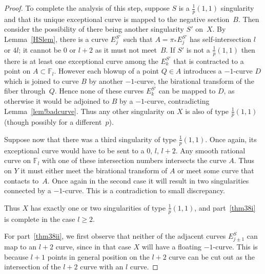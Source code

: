 \documentclass[12pt]{amsbook}
\theoremstyle{plain}
\newcommand{\ldp}{log del Pezzo}
\newcommand{\mb}[1]{\mathbb{#1}}
\newcommand{\F}{\mathbb{F}}
\begin{document}
\begin{proof}
To complete the analysis of this step, suppose $S$ is a $\frac{1}{p}(1,1)$ singularity and that its unique exceptional curve is mapped to the negative section~$B$. Then consider the possibility of there being another singularity $S'$ on~$X$. By Lemma~\ref{HSlem}, there is a curve $E_j^{S'}$ such that $A=\pi_* E_j^{S'}$ has self-intersection $l$ or $4l$; it cannot be $0$ or $l+2$ as it must not meet~$B$. If $S'$ is not a $\frac{1}{p}(1,1)$ then there is at least one exceptional curve among the $E_k^{S'}$ that is contracted to a point on $A\subset\F_l$. However each blowup of a point $Q\in A$ introduces a $-1$-curve $D$ which is joined to curve $B$ by another $-1$-curve, the birational transform of the fiber through~$Q$. Hence none of these curves $E_k^{S'}$ can be mapped to $D$, as otherwise it would be adjoined to $B$ by a $-1$-curve, contradicting Lemma~\ref{lem!badcurve}.
Thus any other singularity on $X$ is also of type $\frac{1}{p}(1,1)$ (though possibly for a different~$p$).

Suppose now that there was a third singularity of type $\frac{1}{p}(1,1)$. Once again, its exceptional curve would have to be sent to a $0, \, l, \, l+2$. Any smooth rational curve on $\F_l$ with one of these intersection numbers intersects the curve $A$. Thus on $Y$ it must either meet the birational transform of $A$ or meet some curve that contacts to~$A$. Once again in the second case it will result in two singularities connected by a $-1$-curve. This is a contradiction to small discrepancy.

Thus $X$ has exactly one or two singularities of type $\frac{1}p(1,1)$,
and part~\eqref{thm38i} is complete in the case $l\ge2$.






For part~\eqref{thm38ii}, we first observe that neither of the adjacent curves $E_{j\pm1}^S$ can
map to an $l+2$ curve, since in that case $X$ will have a floating $-1$-curve. This is because $l+1$ points in general position on the $l+2$ curve can be cut out as the intersection of the $l+2$ curve with an $l$ curve.


\end{proof}
\end{document}
